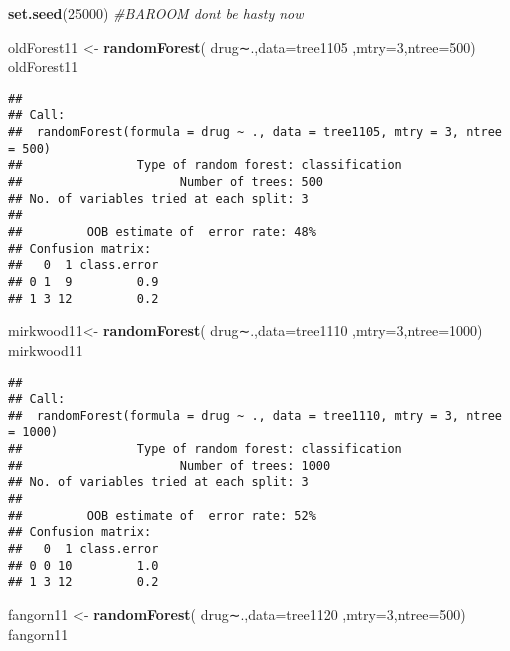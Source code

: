 \documentclass[]{article}
\newenvironment{Shaded}{\begin{snugshade}}{\end{snugshade}}
\newcommand{\KeywordTok}[1]{\textcolor[rgb]{0.13,0.29,0.53}{\textbf{#1}}}
\newcommand{\DataTypeTok}[1]{\textcolor[rgb]{0.13,0.29,0.53}{#1}}
\newcommand{\DecValTok}[1]{\textcolor[rgb]{0.00,0.00,0.81}{#1}}
\newcommand{\StringTok}[1]{\textcolor[rgb]{0.31,0.60,0.02}{#1}}
\newcommand{\CommentTok}[1]{\textcolor[rgb]{0.56,0.35,0.01}{\textit{#1}}}
\newcommand{\NormalTok}[1]{#1}
\begin{document}
\begin{Shaded}
\begin{Highlighting}[]
\KeywordTok{set.seed}\NormalTok{(}\DecValTok{25000}\NormalTok{)}
\CommentTok{#BAROOM dont be hasty now}

\NormalTok{oldForest11 <-}\StringTok{ }\KeywordTok{randomForest}\NormalTok{( drug∼.,}\DataTypeTok{data=}\NormalTok{tree1105  ,}\DataTypeTok{mtry=}\DecValTok{3}\NormalTok{,}\DataTypeTok{ntree=}\DecValTok{500}\NormalTok{)}
\NormalTok{oldForest11}
\end{Highlighting}
\end{Shaded}

\begin{verbatim}
## 
## Call:
##  randomForest(formula = drug ~ ., data = tree1105, mtry = 3, ntree = 500) 
##                Type of random forest: classification
##                      Number of trees: 500
## No. of variables tried at each split: 3
## 
##         OOB estimate of  error rate: 48%
## Confusion matrix:
##   0  1 class.error
## 0 1  9         0.9
## 1 3 12         0.2
\end{verbatim}

\begin{Shaded}
\begin{Highlighting}[]
\NormalTok{mirkwood11<-}\StringTok{ }\KeywordTok{randomForest}\NormalTok{( drug∼.,}\DataTypeTok{data=}\NormalTok{tree1110  ,}\DataTypeTok{mtry=}\DecValTok{3}\NormalTok{,}\DataTypeTok{ntree=}\DecValTok{1000}\NormalTok{)}
\NormalTok{mirkwood11}
\end{Highlighting}
\end{Shaded}

\begin{verbatim}
## 
## Call:
##  randomForest(formula = drug ~ ., data = tree1110, mtry = 3, ntree = 1000) 
##                Type of random forest: classification
##                      Number of trees: 1000
## No. of variables tried at each split: 3
## 
##         OOB estimate of  error rate: 52%
## Confusion matrix:
##   0  1 class.error
## 0 0 10         1.0
## 1 3 12         0.2
\end{verbatim}

\begin{Shaded}
\begin{Highlighting}[]
\NormalTok{fangorn11 <-}\StringTok{ }\KeywordTok{randomForest}\NormalTok{( drug∼.,}\DataTypeTok{data=}\NormalTok{tree1120  ,}\DataTypeTok{mtry=}\DecValTok{3}\NormalTok{,}\DataTypeTok{ntree=}\DecValTok{500}\NormalTok{)}
\NormalTok{fangorn11}
\end{Highlighting}
\end{Shaded}
\end{document}
